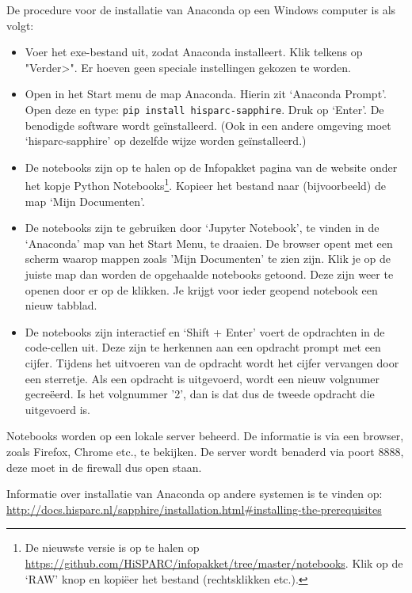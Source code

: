 De procedure voor de installatie van Anaconda op een Windows computer is als volgt:

\begin{itemize}
\item Voer het exe-bestand uit, zodat Anaconda installeert. Klik telkens op "Verder>". Er hoeven geen speciale instellingen gekozen te worden.
\item Open in het Start menu de map Anaconda. Hierin zit `Anaconda Prompt'. Open deze en type: {\tt pip install hisparc-sapphire}. Druk op `Enter'. De benodigde \hisparc software wordt geïnstalleerd. (Ook in een andere \python omgeving moet `hisparc-sapphire' op dezelfde wijze worden geïnstalleerd.)
\item De notebooks zijn op te halen op de Infopakket pagina van de \hisparc website onder het kopje Python Notebooks\footnote{De nieuwste versie is op te halen op \url{https://github.com/HiSPARC/infopakket/tree/master/notebooks}. Klik op de `RAW' knop en kopiëer het bestand (rechtsklikken etc.).}. Kopieer het bestand naar (bijvoorbeeld) de map `Mijn Documenten'. 
\item De notebooks zijn te gebruiken door `Jupyter Notebook', te vinden in de `Anaconda' map van het Start Menu, te draaien. De browser opent met een scherm waarop mappen zoals 'Mijn Documenten' te zien zijn. Klik je op de juiste map dan worden de opgehaalde notebooks getoond. Deze zijn weer te openen door er op de klikken. Je krijgt voor ieder geopend notebook een nieuw tabblad.
\item De notebooks zijn interactief en `Shift + Enter' voert de opdrachten in de code-cellen uit. Deze zijn te herkennen aan een opdracht prompt met een cijfer. Tijdens het uitvoeren van de opdracht wordt het cijfer vervangen door een sterretje. Als een opdracht is uitgevoerd, wordt een nieuw volgnumer gecreëerd. Is het volgnummer '2', dan is dat dus de tweede opdracht die uitgevoerd is.
\end{itemize}

Notebooks worden op een lokale server beheerd. De informatie is via een browser, zoals Firefox, Chrome etc., te bekijken. 
De server wordt benaderd via poort 8888, deze moet in de firewall dus open staan.

Informatie over installatie van Anaconda op andere systemen is te vinden op: \url{http://docs.hisparc.nl/sapphire/installation.html#installing-the-prerequisites} 


